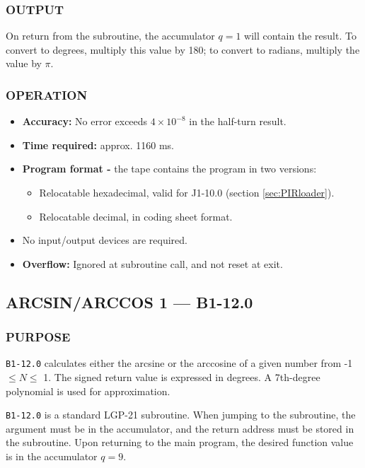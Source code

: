 \subsubsection*{OUTPUT}
On return from the subroutine, the accumulator $q=1$ will contain the result. To convert to degrees, multiply this value by 180; to convert to radians, multiply the value by $\pi$.

\subsubsection*{OPERATION}
\begin{itemize}
    \item \textbf{Accuracy:} No error exceeds $4 \times 10^{-8}$ in the half-turn result.
    \item \textbf{Time required:} approx. 1160 ms.
    \item \textbf{Program format -} the tape contains the program in two versions:
    \begin{itemize}
      \item Relocatable hexadecimal, valid for J1-10.0 (section \ref{sec:PIRloader}).
        \item Relocatable decimal, in coding sheet format.
    \end{itemize}
    \item No input/output devices are required.
    \item \textbf{Overflow:} Ignored at subroutine call, and not reset at exit.
\end{itemize}

\newpage

\subsection*{ARCSIN/ARCCOS 1 --- B1-12.0}
\label{sec:arcsin_arccos_1}

\subsubsection*{PURPOSE}
\texttt{B1-12.0} calculates either the arcsine or the arccosine of a given number from -1 $\le N \le$ 1. The signed return value is expressed in degrees. A 7th-degree polynomial is used for approximation.

\texttt{B1-12.0} is a standard LGP-21 subroutine. When jumping to the subroutine, the argument must be in the accumulator, and the return address must be stored in the subroutine. Upon returning to the main program, the desired function value is in the accumulator $q=9$.

